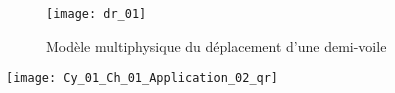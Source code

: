\ifprof
\else
\begin{figure}[H]
\centering
\texttt{[image: dr\_01]}
\caption{Modèle multiphysique du déplacement d’une demi-voile \label{dr_01}}
\end{figure}

\fi


\ifprof
\else
\begin{marginfigure}
\centering
\texttt{[image: Cy\_01\_Ch\_01\_Application\_02\_qr]}
\end{marginfigure}
\fi